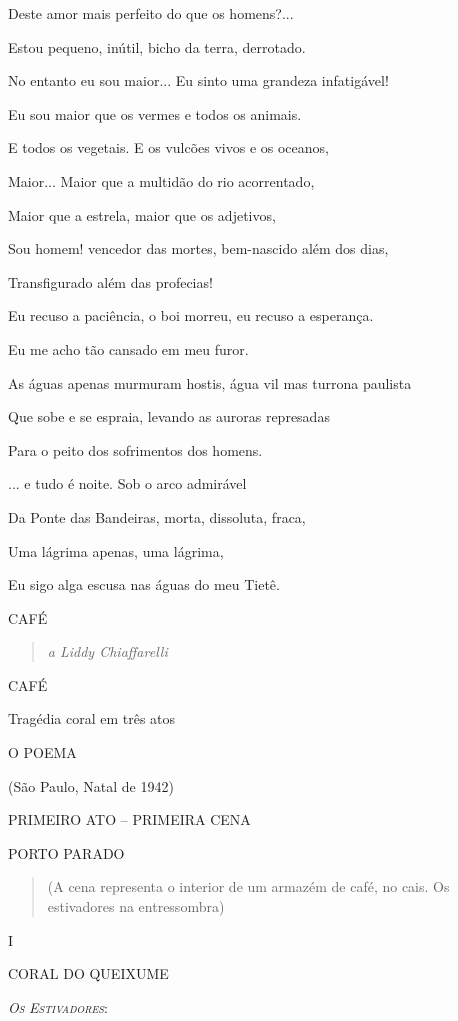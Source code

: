 Deste amor mais perfeito do que os homens?...

Estou pequeno, inútil, bicho da terra, derrotado.

No entanto eu sou maior... Eu sinto uma grandeza infatigável!

Eu sou maior que os vermes e todos os animais.

E todos os vegetais. E os vulcões vivos e os oceanos,

Maior... Maior que a multidão do rio acorrentado,

Maior que a estrela, maior que os adjetivos,

Sou homem! vencedor das mortes, bem-nascido além dos dias,

Transfigurado além das profecias!

Eu recuso a paciência, o boi morreu, eu recuso a esperança.

Eu me acho tão cansado em meu furor.

As águas apenas murmuram hostis, água vil mas turrona paulista

Que sobe e se espraia, levando as auroras represadas

Para o peito dos sofrimentos dos homens.

... e tudo é noite. Sob o arco admirável

Da Ponte das Bandeiras, morta, dissoluta, fraca,

Uma lágrima apenas, uma lágrima,

Eu sigo alga escusa nas águas do meu Tietê.

CAFÉ

\begin{quote}
\emph{a Liddy Chiaffarelli}
\end{quote}

CAFÉ

Tragédia coral em três atos

O POEMA

(São Paulo, Natal de 1942)

PRIMEIRO ATO -- PRIMEIRA CENA

PORTO PARADO

\begin{quote}
(A cena representa o interior de um armazém de café, no cais. Os
estivadores na entressombra)
\end{quote}

I

CORAL DO QUEIXUME

\textsc{\emph{Os} \emph{Estivadores}:}

